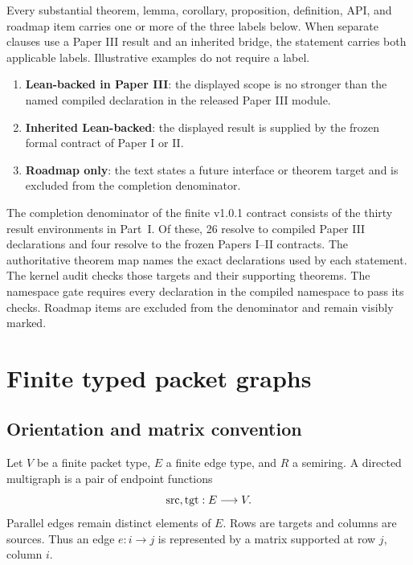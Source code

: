 Every substantial theorem, lemma, corollary, proposition, definition, API,
and roadmap item carries one or more of the three labels below. When separate
clauses use a Paper III result and an inherited bridge, the statement carries
both applicable labels. Illustrative examples do not require a label.
\begin{enumerate}[label=\textbf{S\arabic*.},leftmargin=3.2em]
\item \textbf{Lean-backed in Paper III}: the displayed scope is no stronger
than the named compiled declaration in the released Paper III module.
\item \textbf{Inherited Lean-backed}: the displayed result is supplied by the
frozen formal contract of Paper I or II.
\item \textbf{Roadmap only}: the text states a future interface or theorem
target and is excluded from the completion denominator.
\end{enumerate}

\begin{boundary}
The completion denominator of the finite v1.0.1 contract consists of the
thirty result environments in Part~I. Of these, 26 resolve to compiled
Paper III declarations and four resolve to the frozen Papers I--II
contracts. The authoritative theorem map names the exact declarations used
by each statement. The kernel audit checks those targets and their supporting
theorems. The namespace gate requires every declaration in the compiled
 namespace to pass its checks. Roadmap items are
excluded from the denominator and remain visibly marked.
\end{boundary}

\section{Finite typed packet graphs}
\label{sec:edge-operators}

\subsection{Orientation and matrix convention}

Let $V$ be a finite packet type, $E$ a finite edge type, and $R$ a semiring.
A directed multigraph is a pair of endpoint functions
\[
  \operatorname{src},\operatorname{tgt}:E\longrightarrow V.
\]
Parallel edges remain distinct elements of $E$.  Rows are targets and columns
are sources.  Thus an edge $e:i\to j$ is represented by a matrix supported at
row $j$, column $i$.

